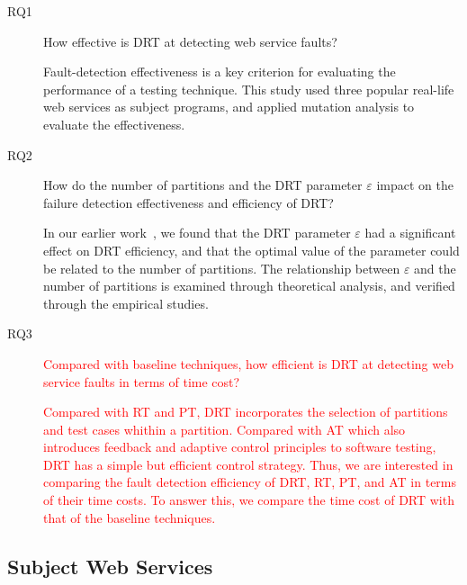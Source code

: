 \documentclass[10pt,journal,compsoc]{IEEEtran}
\begin{document}
\begin{description}
  \item [RQ1] How effective is DRT at detecting web service faults?

  Fault-detection effectiveness is a key criterion for evaluating the performance of a testing technique.
  This study used three popular real-life web services as subject programs, and applied mutation analysis to evaluate the effectiveness.

  \item [RQ2] How do the number of partitions and the DRT parameter $\varepsilon$ impact on the failure detection effectiveness and efficiency of DRT?

  In our earlier work~\cite{sun2012towards}, we found that the DRT parameter $\varepsilon$ had a significant effect on DRT efficiency, and  that the optimal value of the parameter could be related to the number of partitions.
  The relationship between $\varepsilon$ and the number of partitions is examined through theoretical analysis, and verified through the empirical studies.

  \item [RQ3]

  \textcolor{red}{Compared with baseline techniques, how efficient is DRT at detecting web service faults in terms of time cost?}

  \textcolor{red}{Compared with RT and PT, DRT incorporates the selection of partitions and test cases whithin a partition. Compared with AT which also introduces feedback and adaptive control principles to software testing, DRT has a simple but efficient control strategy. Thus, we are interested in comparing the fault detection efficiency of DRT, RT, PT, and AT in terms of their time costs. To answer this, we compare the time cost of DRT with that of the baseline techniques.}


\end{description}

\subsection{Subject Web Services}
\label{sec:subjects}
\end{document}
